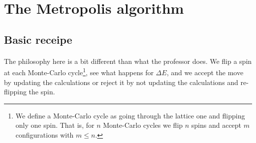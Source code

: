 \documentclass[a4paper, twoside, 11pt]{report}
\theoremstyle{theorem}
\theoremstyle{remark}
\theoremstyle{exemple}
\begin{document}
      
        
                
    \section{The Metropolis algorithm}
    
    	\subsection{Basic receipe}
	
	\paragraph{}The philosophy here is a bit different than what the professor does. We flip  a spin at each Monte-Carlo cycle\footnote{We define a Monte-Carlo cycle as going through the lattice one and flipping only one spin. That is, for $n$ Monte-Carlo cycles we flip $n$ spins and accept $m$ configurations with $m\leq n$.}, see what happens for $\Delta E$, and we accept the move by updating the calculations or reject it by not updating the calculations and re-flipping the spin.
        
\end{document}
